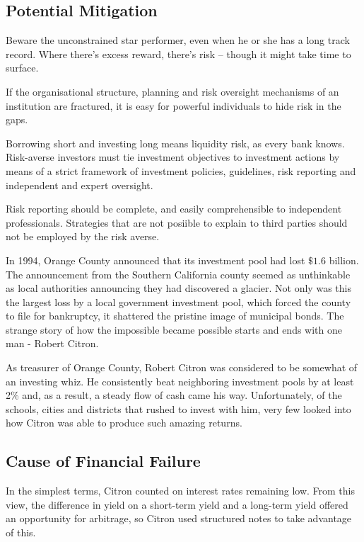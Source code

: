 \documentclass[PRMIA4A.tex]{subfiles}
\begin{document}
\subsection*{Potential Mitigation}
Beware the unconstrained star performer, even when he or she has a long track record. Where there’s excess reward, there’s risk – though it might take time to surface.

If the organisational structure, planning and risk oversight mechanisms of an institution are fractured, it is easy for powerful individuals to hide risk in the gaps.

Borrowing short and investing long means liquidity risk, as every bank knows.
Risk-averse investors must tie investment objectives to investment actions by means of a strict framework of investment policies, guidelines, risk reporting and independent and expert oversight.

Risk reporting should be complete, and easily comprehensible to independent professionals. Strategies that are not posiible to explain to third parties should not be employed by the risk averse.

In 1994, Orange County announced that its investment pool had lost $\$1.6$ billion. The announcement from the Southern California county seemed as unthinkable as local authorities announcing they had discovered a glacier. Not only was this the largest loss by a local government investment pool, which forced the county to file for bankruptcy, it shattered the pristine image of municipal bonds. The strange story of how the impossible became possible starts and ends with one man - Robert Citron.

As treasurer of Orange County, Robert Citron was considered to be somewhat of an investing whiz. He consistently beat neighboring investment pools by at least 2\% and, as a result, a steady flow of cash came his way. Unfortunately, of the schools, cities and districts that rushed to invest with him, very few looked into how Citron was able to produce such amazing returns.

\subsection*{Cause of Financial Failure}

In the simplest terms, Citron counted on interest rates remaining low. From this view, the difference in yield on a short-term yield and a long-term yield offered an opportunity for arbitrage, so Citron used structured notes to take advantage of this.
\end{document}
